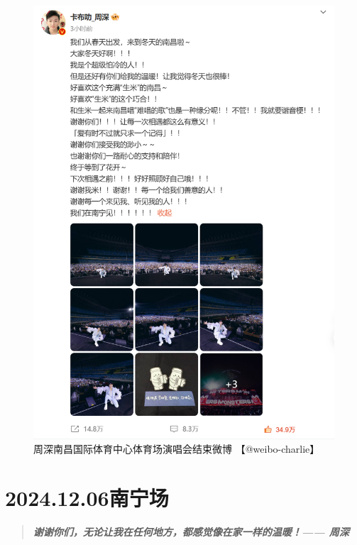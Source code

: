 \documentclass[]{ctexbook}
\begin{document}
\begin{figure}

{\centering \includegraphics{img/weibo/nanchang-20241123} 

}

\caption{周深南昌国际体育中心体育场演唱会结束微博 【@weibo-charlie】}\label{fig:unnamed-chunk-147}
\end{figure}

\chapter{2024.12.06南宁场}\label{nanning-20241206}

\begin{quote}
\textbf{\emph{谢谢你们，无论让我在任何地方，都感觉像在家一样的温暖！------ 周深}}
\end{quote}
\end{document}
